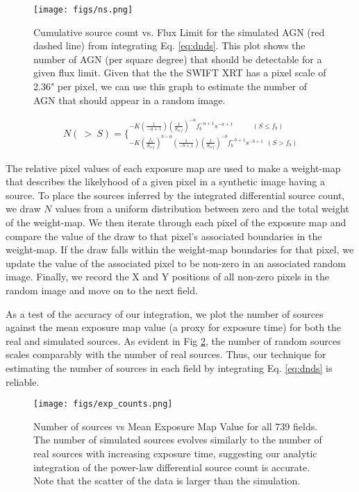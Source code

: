 \documentclass[preprint]{aastex63}
\begin{document}
\begin{figure}[!ht]
    \centering
    \texttt{[image: figs/ns.png]}
    \label{fig:ns}
    \caption{Cumulative source count vs. Flux Limit for the simulated AGN (red dashed line) 
    from integrating Eq. \ref{eq:dnds}. This plot shows the number of AGN (per square degree) that should
    be detectable for a given flux limit. Given that the the SWIFT XRT has a pixel scale of 2.36" per pixel, we can 
    use this graph to estimate the number of AGN that should appear in a random image.}
\end{figure}

\begin{align}
    \label{eq:nss}
    N( \ > \ S ) = \bigg\{^{-K\left(\frac{1}{-a+1}\right)\left(\frac{1}{S_{ref}}\right)^{-a}f_b^{-a+1}s^{-a+1} \ \ \ \ \ \ \ \ \ \ \ \ \ (S \leq f_b)}_
    {-K \left(\frac{f_b}{S_{ref}}\right)^{b-a}\left(\frac{1}{-b+1}\right)\left(\frac{1}{S_{ref}}\right)^{-b}f_b^{-b+1}s^{-b+1} \ \ (S > f_b)}
\end{align}

The relative pixel values of each exposure map are used to make a weight-map that describes the 
likelyhood of a given pixel in a synthetic image having a source. To place the sources inferred by the integrated differential source count,
we draw $N$ values from a uniform distribution between zero and the total weight of the 
weight-map. We then iterate through each pixel of the exposure map and compare the value of the draw to that pixel's
associated boundaries in the weight-map. If the draw falls within the weight-map boundaries for that pixel,
we update the value of the associated pixel to be non-zero in an associated random image. Finally, we record the X and Y positions of all 
non-zero pixels in the random image and move on to the next field.


As a test of the accuracy of our integration, we plot the number of sources against the mean exposure map value
(a proxy for exposure time) for both the real and simulated sources. As evident in Fig \ref{fig:exp_counts}, the number of random sources scales
comparably with the number of real sources. Thus, our technique for estimating the number of sources in each field by integrating
Eq. \ref{eq:dnds} is reliable.

\begin{figure}[!ht]
    \centering
    \texttt{[image: figs/exp\_counts.png]}
    \label{fig:exp_counts}
    \caption{Number of sources vs Mean Exposure Map Value for all 739 fields. The number of simulated sources
    evolves similarly to the number of real sources with increasing exposure time, suggesting our analytic integration of the power-law
    differential source count is accurate. Note that the scatter of the data is larger than the simulation. }
\end{figure}
\end{document}
